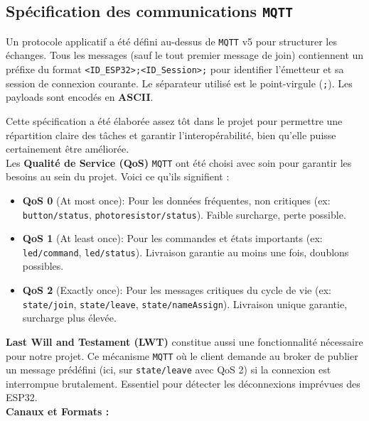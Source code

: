 \documentclass[12pt]{article}
\begin{document}
\subsection{Spécification des communications \texttt{MQTT}}

Un protocole applicatif a été défini au-dessus de \texttt{MQTT} v5 pour structurer les échanges. Tous les messages (sauf le tout premier message de join) contiennent un préfixe du format \texttt{<ID\_ESP32>;<ID\_Session>;} pour identifier l'émetteur et sa session de connexion courante. Le séparateur utilisé est le point-virgule (\texttt{;}). Les payloads sont encodés en \textbf{ASCII}.

Cette spécification a été élaborée assez tôt dans le projet pour permettre une répartition claire des tâches et garantir l'interopérabilité, bien qu'elle puisse certainement être améliorée. \\

Les \textbf{Qualité de Service (QoS)} \texttt{MQTT} ont été choisi avec soin pour garantir les besoins au sein du
projet. Voici ce qu'ils signifient :
\begin{itemize}
    \item \textbf{QoS 0} (At most once): Pour les données fréquentes, non critiques (ex: \texttt{button/status}, \texttt{photoresistor/status}). Faible surcharge, perte possible.
    \item \textbf{QoS 1} (At least once): Pour les commandes et états importants (ex: \texttt{led/command}, \texttt{led/status}). Livraison garantie au moins une fois, doublons possibles.
    \item \textbf{QoS 2} (Exactly once): Pour les messages critiques du cycle de vie (ex: \texttt{state/join}, \texttt{state/leave}, \texttt{state/nameAssign}). Livraison unique garantie, surcharge plus élevée.
\end{itemize} \hfill \break

\textbf{Last Will and Testament (LWT)} constitue aussi une fonctionnalité nécessaire pour notre projet. Ce mécanisme \texttt{MQTT} où le client demande au broker de publier un message prédéfini (ici, sur \texttt{state/leave} avec QoS 2) si la connexion est interrompue brutalement. Essentiel pour détecter les déconnexions imprévues des ESP32. \\

\textbf{Canaux et Formats :}
\end{document}
